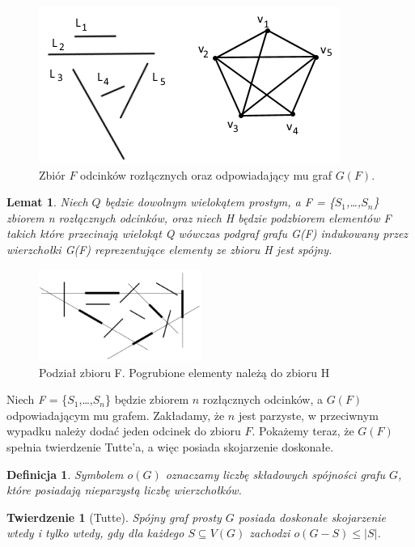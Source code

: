 \documentclass[brudnopis]{xmgr}
\newtheorem{Twierdzenie}{Twierdzenie}
\newtheorem{Lemat}{Lemat}
\newtheorem{Definicja}{Definicja}
\begin{document}
\begin{figure}[ht!]\label{zbior odcinkow rozlacznych}
 \centering
  \includegraphics{rysunki/g_f.png}
  \caption{Zbiór $F$ odcinków rozłącznych oraz odpowiadający mu graf $G(F)$.}
\end{figure} 

\begin{Lemat}\label{podgraf indukowany}
Niech $Q$ będzie dowolnym wielokątem prostym, a F = \textnormal{\{}$S_1$,\ldots,$S_n$\textnormal{\}} zbiorem n rozłącznych odcinków, oraz niech H będzie podzbiorem elementów F takich które przecinają wielokąt Q wówczas podgraf grafu G\textnormal{(}F\textnormal{)} indukowany przez wierzchołki G\textnormal{(}F\textnormal{)} reprezentujące elementy ze zbioru H jest spójny.
\end{Lemat}
\begin{figure}[ht!]
 \centering
  \includegraphics[height=3cm]{rysunki/podzial_h.png}
  \caption{Podział zbioru F. Pogrubione elementy należą do zbioru H}
\end{figure} 
Niech \textit{F} = \{$S_1$,\ldots,$S_n$\} będzie zbiorem $n$ rozłącznych odcinków, a $G(F)$ odpowiadającym mu grafem. Zakładamy, że $n$ jest parzyste, w przeciwnym wypadku należy dodać jeden odcinek do zbioru $F$. Pokażemy teraz, że $G(F)$ spełnia twierdzenie Tutte'a, a więc posiada skojarzenie doskonałe.
\begin{Definicja}
	Symbolem $o(G)$ oznaczamy liczbę składowych spójności grafu $G$, które posiadają nieparzystą liczbę wierzchołków.
\end{Definicja}
\begin{Twierdzenie}[Tutte]
	Spójny graf prosty $G$ posiada \textnormal{doskonałe skojarzenie} wtedy i tylko wtedy, gdy dla każdego $S \subseteq V(G)$ zachodzi $o(G-S) \le |S|$.
\end{Twierdzenie}
\end{document}

